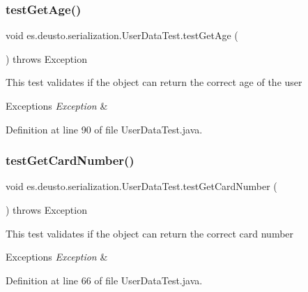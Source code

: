 \subsubsection{\texorpdfstring{test\+Get\+Age()}{testGetAge()}}
{\footnotesize\ttfamily void es.\+deusto.\+serialization.\+User\+Data\+Test.\+test\+Get\+Age (\begin{DoxyParamCaption}{ }\end{DoxyParamCaption}) throws Exception}

This test validates if the object can return the correct age of the user 
\begin{DoxyExceptions}{Exceptions}
{\em Exception} & \\
\hline
\end{DoxyExceptions}


Definition at line 90 of file User\+Data\+Test.\+java.

\mbox{\label{classes_1_1deusto_1_1serialization_1_1_user_data_test_ae66eef68b1682794e0433b331e6ccff5}} 
\subsubsection{\texorpdfstring{test\+Get\+Card\+Number()}{testGetCardNumber()}}
{\footnotesize\ttfamily void es.\+deusto.\+serialization.\+User\+Data\+Test.\+test\+Get\+Card\+Number (\begin{DoxyParamCaption}{ }\end{DoxyParamCaption}) throws Exception}

This test validates if the object can return the correct card number 
\begin{DoxyExceptions}{Exceptions}
{\em Exception} & \\
\hline
\end{DoxyExceptions}


Definition at line 66 of file User\+Data\+Test.\+java.

\mbox{\label{classes_1_1deusto_1_1serialization_1_1_user_data_test_ab89ad0d38dbae7e956619e6543586122}} 
